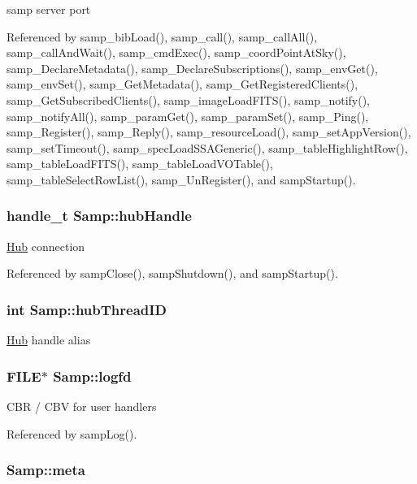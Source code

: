 samp server port 

Referenced by samp\_\-bibLoad(), samp\_\-call(), samp\_\-callAll(), samp\_\-callAndWait(), samp\_\-cmdExec(), samp\_\-coordPointAtSky(), samp\_\-DeclareMetadata(), samp\_\-DeclareSubscriptions(), samp\_\-envGet(), samp\_\-envSet(), samp\_\-GetMetadata(), samp\_\-GetRegisteredClients(), samp\_\-GetSubscribedClients(), samp\_\-imageLoadFITS(), samp\_\-notify(), samp\_\-notifyAll(), samp\_\-paramGet(), samp\_\-paramSet(), samp\_\-Ping(), samp\_\-Register(), samp\_\-Reply(), samp\_\-resourceLoad(), samp\_\-setAppVersion(), samp\_\-setTimeout(), samp\_\-specLoadSSAGeneric(), samp\_\-tableHighlightRow(), samp\_\-tableLoadFITS(), samp\_\-tableLoadVOTable(), samp\_\-tableSelectRowList(), samp\_\-UnRegister(), and sampStartup().\hypertarget{structSamp_03918136809ece7e60de4e30c64b6224}{
\subsubsection[{hubHandle}]{\setlength{\rightskip}{0pt plus 5cm}handle\_\-t {\bf Samp::hubHandle}}}
\label{structSamp_03918136809ece7e60de4e30c64b6224}


\hyperlink{structHub}{Hub} connection 

Referenced by sampClose(), sampShutdown(), and sampStartup().\hypertarget{structSamp_723b2538cfd65122c49783b36a7d30b5}{
\subsubsection[{hubThreadID}]{\setlength{\rightskip}{0pt plus 5cm}int {\bf Samp::hubThreadID}}}
\label{structSamp_723b2538cfd65122c49783b36a7d30b5}


\hyperlink{structHub}{Hub} handle alias \hypertarget{structSamp_7a7b2ade9816147464d784518bcad01d}{
\subsubsection[{logfd}]{\setlength{\rightskip}{0pt plus 5cm}FILE$\ast$ {\bf Samp::logfd}}}
\label{structSamp_7a7b2ade9816147464d784518bcad01d}


CBR / CBV for user handlers 

Referenced by sampLog().\hypertarget{structSamp_0884021074d1ed14342187005e0b78e7}{
\subsubsection[{meta}]{ {\bf Samp::meta}}}
\label{structSamp_0884021074d1ed14342187005e0b78e7}


